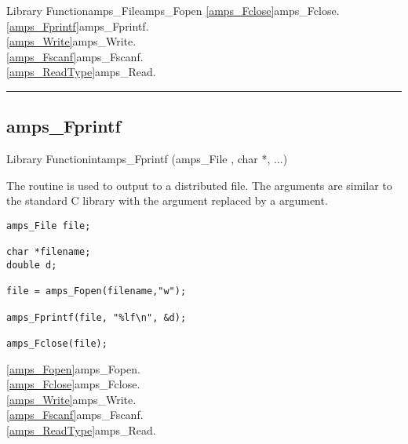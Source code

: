 \begin{deftypefn}{Library Function}{amps_File}{amps\_Fopen}
\SEEALSO
\vref{amps_Fclose}{amps\_Fclose}. \\
\vref{amps_Fprintf}{amps\_Fprintf}. \\
\vref{amps_Write}{amps\_Write}. \\
\vref{amps_Fscanf}{amps\_Fscanf}. \\
\vref{amps_ReadType}{amps\_Read}. \\

\end{deftypefn}


\noindent\rule{\textwidth}{1mm}

\subsection{amps\_Fprintf}
\label{amps_Fprintf}



\begin{deftypefn}{Library Function}{int}{amps\_Fprintf}
(amps_File , char *, ...) 

\DESCRIPTION

The routine  is used to output to a distributed file.
The arguments are similar to the standard C library  with
the  argument replaced by a  argument.

\EXAMPLE
\begin{display}\begin{verbatim}
amps_File file;

char *filename;
double d;

file = amps_Fopen(filename,"w");

amps_Fprintf(file, "%lf\n", &d);

amps_Fclose(file);
\end{verbatim}\end{display}

\SEEALSO
\vref{amps_Fopen}{amps\_Fopen}. \\
\vref{amps_Fclose}{amps\_Fclose}. \\
\vref{amps_Write}{amps\_Write}. \\
\vref{amps_Fscanf}{amps\_Fscanf}. \\
\vref{amps_ReadType}{amps\_Read}. \\

\end{deftypefn}

